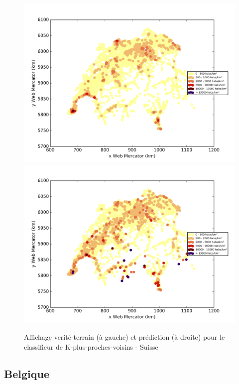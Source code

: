 \documentclass{book}
\begin{document}
\begin{figure}[H]
\centerline{
\includegraphics[scale=0.5]{../../data/Suisse/test/Nearest_Neighboors_Classification/Nearest_Neighboors_Classification/density_ground_truth.png}
\includegraphics[scale=0.5]{../../data/Suisse/test/Nearest_Neighboors_Classification/Nearest_Neighboors_Classification/density_classification.png}
}
\caption{Affichage verité-terrain (à gauche) et prédiction (à droite) pour le classifieur de K-plus-proches-voisins - Suisse}
\label{nn_carte_suisse}
\end{figure}


\subsection{Belgique}
\end{document}
